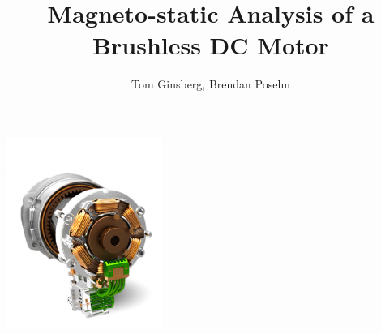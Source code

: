\documentclass{beamer}
\title[Your Short Title]{Magneto-static Analysis of a Brushless DC Motor}
\author{\small Tom Ginsberg, Brendan Posehn}
\date{}
\begin{document}
    \begin{frame}
        \vspace{0.5cm}
        \titlepage
        \vspace{-1.5cm}
        \begin{center}
            \includegraphics[width=2in]{render.png}
        \end{center}
    \end{frame}
\end{document}
